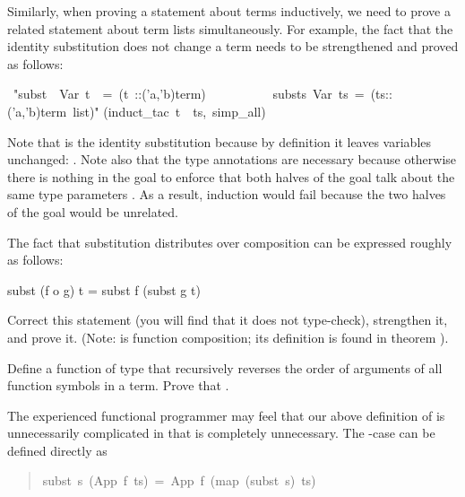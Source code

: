 \begin{isabelle}
\begin{isamarkuptext}
Similarly, when proving a statement about terms inductively, we need
to prove a related statement about term lists simultaneously. For example,
the fact that the identity substitution does not change a term needs to be
strengthened and proved as follows:%
\end{isamarkuptext}%
\ {"}subst\ \ Var\ t\ \ =\ (t\ ::('a,'b)term)\ \ {\isasymand}\isanewline
\ \ \ \ \ \ \ \ substs\ Var\ ts\ =\ (ts::('a,'b)term\ list){"}\isanewline
{}(induct\_tac\ t\ \ ts,\ simp\_all)%
\begin{isamarkuptext}%
\noindent
Note that  is the identity substitution because by definition it
leaves variables unchanged: . Note also
that the type annotations are necessary because otherwise there is nothing in
the goal to enforce that both halves of the goal talk about the same type
parameters . As a result, induction would fail
because the two halves of the goal would be unrelated.

\begin{exercise}
The fact that substitution distributes over composition can be expressed
roughly as follows:
\begin{ttbox}
subst (f o g) t = subst f (subst g t)
\end{ttbox}
Correct this statement (you will find that it does not type-check),
strengthen it, and prove it. (Note:  is function composition;
its definition is found in theorem ).
\end{exercise}
\begin{exercise}\label{ex:trev-trev}
  Define a function  of type  that
  recursively reverses the order of arguments of all function symbols in a
  term. Prove that .
\end{exercise}

The experienced functional programmer may feel that our above definition of
 is unnecessarily complicated in that  is completely
unnecessary. The -case can be defined directly as
\begin{quote}

\begin{isabelle}%
subst\ \mbox{s}\ (App\ \mbox{f}\ \mbox{ts})\ =\ App\ \mbox{f}\ (map\ (subst\ \mbox{s})\ \mbox{ts})
\end{isabelle}%


\end{quote}
\end{isamarkuptext}
\end{isabelle}
